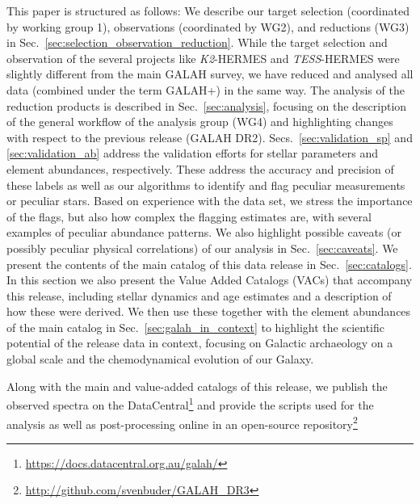 \documentclass[fleqn,usenatbib,useAMS]{mnras}
\newcommand{\tess}{\textit{TESS}\xspace}
\newcommand{\Ktwo}{\textit{K2}\xspace}
\begin{document}
This paper is structured as follows: We describe our target selection (coordinated by working group 1), observations (coordinated by WG2), and reductions (WG3) in Sec.~\ref{sec:selection_observation_reduction}. While the target selection and observation of the several projects like \Ktwo-HERMES and \tess-HERMES were slightly different from the main GALAH survey, we have reduced and analysed all data (combined under the term GALAH+) in the same way. The analysis of the reduction products is described in Sec.~\ref{sec:analysis}, focusing on the description of the general workflow of the analysis group (WG4) and highlighting changes with respect to the previous release (GALAH DR2). Secs.~\ref{sec:validation_sp} and \ref{sec:validation_ab} address the validation efforts for stellar parameters and element abundances, respectively. These address the accuracy and precision of these labels as well as our algorithms to identify and flag peculiar measurements or peculiar stars. Based on experience with the data set, we stress the importance of the flags, but also how complex the flagging estimates are, with several examples of peculiar abundance patterns. We also highlight possible caveats (or possibly peculiar physical correlations) of our analysis in Sec.~\ref{sec:caveats}. We present the contents of the main catalog of this data release in Sec.~\ref{sec:catalogs}. In this section we also present the Value Added Catalogs (VACs) that accompany this release, including stellar dynamics and age estimates and a description of how these were derived. We then use these together with the element abundances of the main catalog in Sec.~\ref{sec:galah_in_context} to highlight the scientific potential of the release data in context, focusing on Galactic archaeology on a global scale and the chemodynamical evolution of our Galaxy. 

Along with the main and value-added catalogs of this release, we publish the observed spectra on the DataCentral\footnote{\url{https://docs.datacentral.org.au/galah/}} and provide the scripts used for the analysis as well as post-processing online in an open-source repository\footnote{\url{http://github.com/svenbuder/GALAH\_DR3}}
\end{document}
